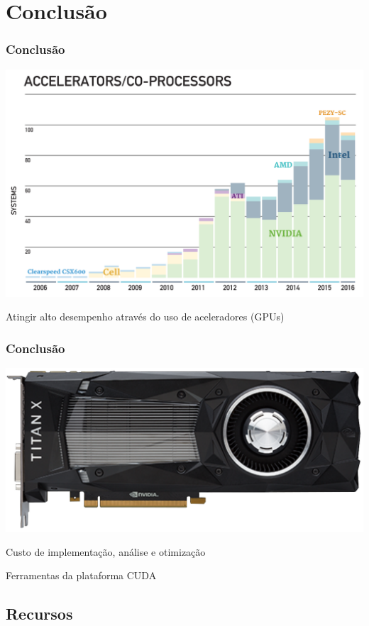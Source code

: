 \documentclass[10pt, compress]{beamer}
\begin{document}
\section{Conclusão}

\begin{frame}
    \frametitle{Conclusão}
    \centering
        \includegraphics[width=.75\textwidth]{top500_accel}
    \vfill

    Atingir \alert{alto desempenho} através do uso de \alert{aceleradores} \pause (\alert{GPUs})
\end{frame}

\begin{frame}
    \frametitle{Conclusão}
    \begin{center}
        \includegraphics[width=.5\textwidth]{titan_x}
    \end{center}
    \vfill

    \pause
    Custo de \alert{implementação}, \alert{análise} e \alert{otimização}

    \pause
    \alert{Ferramentas} da plataforma \alert{CUDA}
\end{frame}

\subsection{Recursos}
\end{document}
